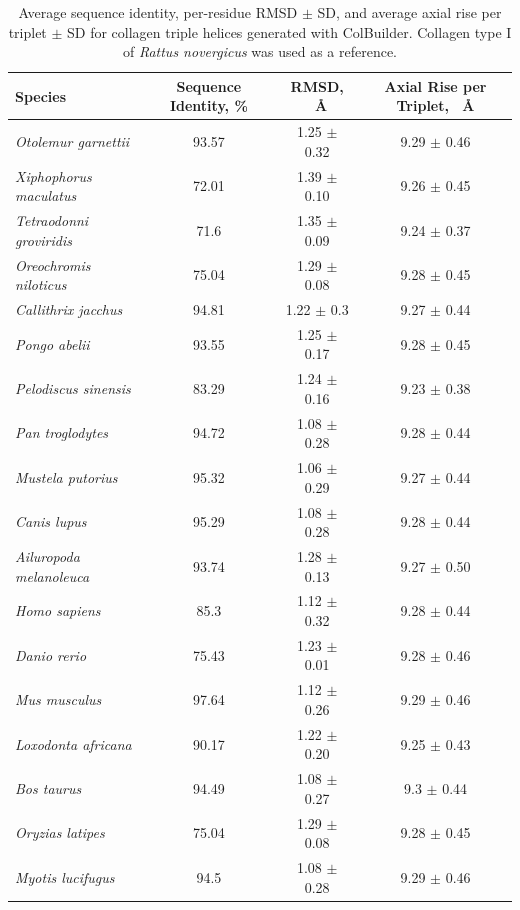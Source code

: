 \documentclass[10pt,letterpaper]{article}
\begin{document}
\begin{table}[!ht]
    \centering
    \caption{Average sequence identity, per-residue RMSD \(\pm\) SD, and average axial rise per triplet \(\pm\) SD for collagen triple helices generated with ColBuilder. Collagen type I of \textit{Rattus novergicus} was used as a reference.}
    \begin{tabular}{lccc}
    \hline
        \textbf{Species} & \textbf{Sequence Identity, \%} & \textbf{RMSD, \SI{}{\angstrom}} &\textbf{Axial Rise per Triplet, \SI{}{\angstrom}} \\ \hline
        \textit{Otolemur garnettii} & 93.57 & 1.25 \(\pm\) 0.32 & 9.29 \(\pm\) 0.46 \\ 
        \textit{Xiphophorus maculatus} & 72.01 & 1.39 \(\pm\) 0.10 & 9.26 \(\pm\) 0.45 \\ 
        \textit{Tetraodonni groviridis} & 71.6  & 1.35 \(\pm\) 0.09 & 9.24 \(\pm\) 0.37 \\ 
        \textit{Oreochromis niloticus} & 75.04 & 1.29 \(\pm\) 0.08 & 9.28 \(\pm\) 0.45 \\ 
        \textit{Callithrix jacchus} & 94.81 & 1.22 \(\pm\) 0.3 & 9.27 \(\pm\) 0.44 \\ 
        \textit{Pongo abelii} & 93.55 & 1.25 \(\pm\) 0.17 & 9.28 \(\pm\) 0.45 \\ 
        \textit{Pelodiscus sinensis} & 83.29 & 1.24 \(\pm\) 0.16 & 9.23 \(\pm\) 0.38 \\ 
        \textit{Pan troglodytes} & 94.72 & 1.08 \(\pm\) 0.28 & 9.28 \(\pm\) 0.44 \\ 
        \textit{Mustela putorius} & 95.32 & 1.06 \(\pm\) 0.29 & 9.27 \(\pm\) 0.44 \\ 
        \textit{Canis lupus} & 95.29 & 1.08 \(\pm\) 0.28 & 9.28 \(\pm\) 0.44 \\ 
        \textit{Ailuropoda melanoleuca} & 93.74 & 1.28 \(\pm\) 0.13 & 9.27 \(\pm\) 0.50 \\ 
        \textit{Homo sapiens} & 85.3 & 1.12 \(\pm\) 0.32 & 9.28 \(\pm\) 0.44 \\ 
        \textit{Danio rerio} & 75.43 & 1.23 \(\pm\) 0.01 & 9.28 \(\pm\) 0.46 \\ 
        \textit{Mus musculus} & 97.64 & 1.12 \(\pm\) 0.26 & 9.29 \(\pm\) 0.46 \\ 
        \textit{Loxodonta africana} & 90.17 & 1.22 \(\pm\) 0.20 & 9.25 \(\pm\) 0.43 \\ 
        \textit{Bos taurus} & 94.49 & 1.08 \(\pm\) 0.27 & 9.3 \(\pm\) 0.44 \\ 
        \textit{Oryzias latipes} & 75.04 & 1.29 \(\pm\) 0.08 & 9.28 \(\pm\) 0.45 \\ 
        \textit{Myotis lucifugus} & 94.5 & 1.08 \(\pm\) 0.28 & 9.29 \(\pm\) 0.46 \\ \hline
    \end{tabular}
    \label{table:SI_homology}
\end{table}
\end{document}
